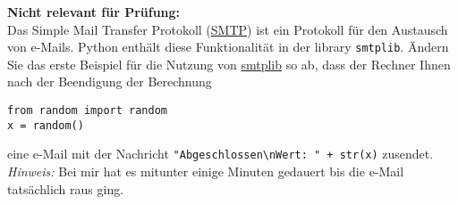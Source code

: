 \textbf{Nicht relevant für Prüfung:}\\
Das Simple Mail Transfer Protokoll (\href{https://de.wikipedia.org/wiki/Simple_Mail_Transfer_Protocol}{SMTP}) ist ein Protokoll für den Austausch von e-Mails. Python enthält diese Funktionalität in der library \verb|smtplib|. Ändern Sie das erste Beispiel für die Nutzung von \href{https://docs.python.org/3/library/email.examples.html}{smtplib} so ab, dass der Rechner Ihnen nach der Beendigung der Berechnung 
\begin{lstlisting}
from random import random 
x = random()
\end{lstlisting}
eine e-Mail mit der Nachricht \verb|"Abgeschlossen\nWert: " + str(x)| zusendet. \\

\textit{Hinweis: } Bei mir hat es mitunter einige Minuten gedauert bis die e-Mail tatsächlich raus ging.